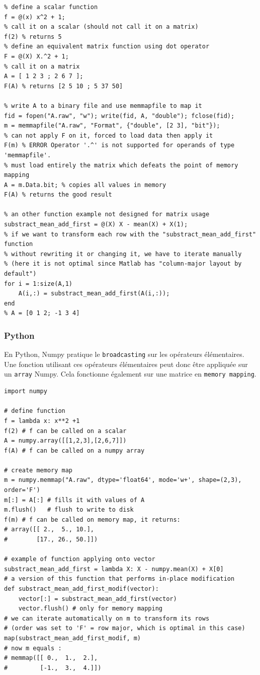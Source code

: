 
\matlabstyle
\begin{lstlisting}
% define a scalar function
f = @(x) x^2 + 1;
% call it on a scalar (should not call it on a matrix)
f(2) % returns 5
% define an equivalent matrix function using dot operator
F = @(X) X.^2 + 1;
% call it on a matrix
A = [ 1 2 3 ; 2 6 7 ];
F(A) % returns [2 5 10 ; 5 37 50]

% write A to a binary file and use memmapfile to map it
fid = fopen("A.raw", "w"); write(fid, A, "double"); fclose(fid);
m = memmapfile("A.raw", "Format", {"double", [2 3], "bit"});
% can not apply F on it, forced to load data then apply it
F(m) % ERROR Operator '.^' is not supported for operands of type 'memmapfile'.
% must load entirely the matrix which defeats the point of memory mapping
A = m.Data.bit; % copies all values in memory
F(A) % returns the good result

% an other function example not designed for matrix usage
substract_mean_add_first = @(X) X - mean(X) + X(1);
% if we want to transform each row with the "substract_mean_add_first" function
% without rewriting it or changing it, we have to iterate manually
% (here it is not optimal since Matlab has "column-major layout by default")
for i = 1:size(A,1)
    A(i,:) = substract_mean_add_first(A(i,:));
end
% A = [0 1 2; -1 3 4]
\end{lstlisting}

\subsubsection{Python}

En Python, Numpy pratique le \verb|broadcasting| sur les opérateurs élémentaires. Une fonction utilisant ces opérateurs élémentaires peut donc être appliquée sur un \verb|array| Numpy. Cela fonctionne également sur une matrice en \verb|memory mapping|.

\pythonstyle
\begin{lstlisting}
import numpy

# define function
f = lambda x: x**2 +1
f(2) # f can be called on a scalar
A = numpy.array([[1,2,3],[2,6,7]])
f(A) # f can be called on a numpy array

# create memory map
m = numpy.memmap("A.raw", dtype='float64', mode='w+', shape=(2,3), order='F')
m[:] = A[:] # fills it with values of A
m.flush()	# flush to write to disk
f(m) # f can be called on memory map, it returns:
# array([[ 2.,  5., 10.],
#        [17., 26., 50.]])

# example of function applying onto vector
substract_mean_add_first = lambda X: X - numpy.mean(X) + X[0]
# a version of this function that performs in-place modification
def substract_mean_add_first_modif(vector):
	vector[:] = substract_mean_add_first(vector)
	vector.flush() # only for memory mapping
# we can iterate automatically on m to transform its rows
# (order was set to 'F' = row major, which is optimal in this case)
map(substract_mean_add_first_modif, m)
# now m equals :
# memmap([[ 0.,  1.,  2.],
#         [-1.,  3.,  4.]])
\end{lstlisting}

